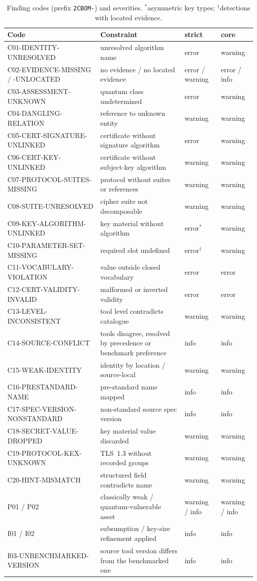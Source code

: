 \documentclass[11pt,a4paper]{article}
\theoremstyle{definition}
\theoremstyle{plain}
\begin{document}
\begin{table}[ht]\centering\footnotesize
\begin{tabularx}{\textwidth}{lXll}
\toprule
Code & Constraint & strict & core\\
\midrule
C01-IDENTITY-UNRESOLVED & unresolved algorithm name & error & warning\\
C02-EVIDENCE-MISSING / -UNLOCATED & no evidence / no located evidence & error / warning & error / info\\
C03-ASSESSMENT-UNKNOWN & quantum class undetermined & error & warning\\
C04-DANGLING-RELATION & reference to unknown entity & warning & warning\\
C05-CERT-SIGNATURE-UNLINKED & certificate without signature algorithm & error & warning\\
C06-CERT-KEY-UNLINKED & certificate without subject-key algorithm & warning & warning\\
C07-PROTOCOL-SUITES-MISSING & protocol without suites or references & warning & warning\\
C08-SUITE-UNRESOLVED & cipher suite not decomposable & warning & warning\\
C09-KEY-ALGORITHM-UNLINKED & key material without algorithm & error$^{*}$ & warning\\
C10-PARAMETER-SET-MISSING & required slot undefined & error$^{\dagger}$ & warning\\
C11-VOCABULARY-VIOLATION & value outside closed vocabulary & error & error\\
C12-CERT-VALIDITY-INVALID & malformed or inverted validity & error & error\\
C13-LEVEL-INCONSISTENT & tool level contradicts catalogue & warning & warning\\
C14-SOURCE-CONFLICT & tools disagree, resolved by precedence or benchmark preference & info & info\\
C15-WEAK-IDENTITY & identity by location / source-local & warning & warning\\
C16-PRESTANDARD-NAME & pre-standard name mapped & info & info\\
C17-SPEC-VERSION-NONSTANDARD & non-standard source spec version & info & info\\
C18-SECRET-VALUE-DROPPED & key material value discarded & warning & warning\\
C19-PROTOCOL-KEX-UNKNOWN & TLS~1.3 without recorded groups & warning & warning\\
C20-HINT-MISMATCH & structured field contradicts name & warning & warning\\
P01 / P02 & classically weak / quantum-vulnerable asset & warning / info & warning / info\\
I01 / I02 & subsumption / key-size refinement applied & info & info\\
I03-UNBENCHMARKED-VERSION & source tool version differs from the benchmarked one & info & info\\
\bottomrule
\end{tabularx}
\caption{Finding codes (prefix \texttt{2CBOM-}) and severities. $^{*}$asymmetric key types;
$^{\dagger}$detections with located evidence.}
\end{table}
\end{document}

